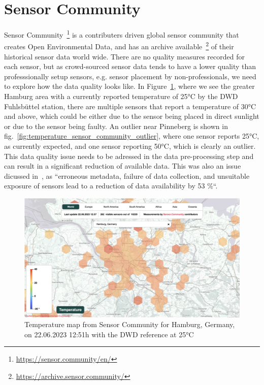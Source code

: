 \section{Sensor Community}

Sensor Community~\footnote{\url{https://sensor.community/en/}} is a contributers driven global sensor community that creates Open Environmental Data, and has an archive available~\footnote{\url{https://archive.sensor.community/}} of their historical sensor data world wide. There are no quality measures recorded for each sensor, but as crowd-sourced sensor data tends to have a lower quality than professsionally setup sensors, e.g. sensor placement by non-professionals, we need to explore how the data quality looks like.
In Figure~\ref{fig:temperature_sensor_community_map}, where we see the greater Hamburg area with a currently reported temperature of 25°C by the DWD Fuhlsbüttel station, there are multiple sensors that report a temperature of 30°C and above, which could be either due to the sensor being placed in direct sunlight or due to the sensor being faulty. An outlier near Pinneberg is shown in fig.~\ref{fig:temperature_sensor_community_outlier}, where one sensor reports 25°C, as currently expected, and one sensor reporting 50°C, which is clearly an outlier. This data quality issue needs to be adressed in the data pre-processing step and can result in a significant reduction of available data. This was also an issue dicussed in~\cite{meier2017crowdsourcing}, as ``erroneous metadata, failure of data collection, and unsuitable exposure of sensors lead to a reduction of data availability by 53 \%``.

\begin{figure}[ht]
    \centering
    \includegraphics[width=1\textwidth]{images/sensor_community_temperature_map.png}
    \caption{Temperature map from Sensor Community for Hamburg, Germany, on 22.06.2023 12:51h with the DWD reference at 25°C}
    \label{fig:temperature_sensor_community_map}
\end{figure}

